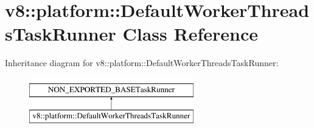 \hypertarget{classv8_1_1platform_1_1DefaultWorkerThreadsTaskRunner}{}\section{v8\+:\+:platform\+:\+:Default\+Worker\+Threads\+Task\+Runner Class Reference}
\label{classv8_1_1platform_1_1DefaultWorkerThreadsTaskRunner}
Inheritance diagram for v8\+:\+:platform\+:\+:Default\+Worker\+Threads\+Task\+Runner\+:\begin{figure}[H]
\begin{center}
\leavevmode
\includegraphics[height=2.000000cm]{classv8_1_1platform_1_1DefaultWorkerThreadsTaskRunner}
\end{center}
\end{figure}
